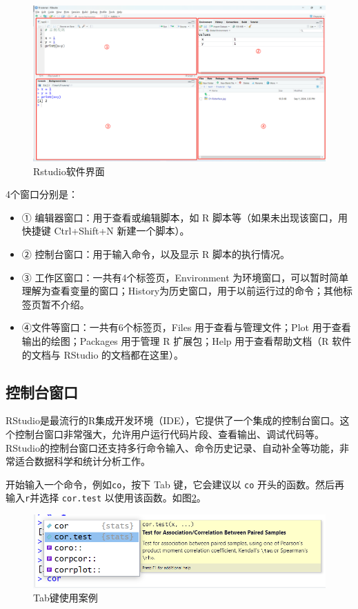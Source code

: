 \documentclass[
]{book}
\providecommand{\tightlist}{%
  \setlength{\itemsep}{0pt}\setlength{\parskip}{0pt}}
\begin{document}
\begin{figure}

{\centering \includegraphics[width=0.8\linewidth]{figs/02-Rstudio} 

}

\caption{Rstudio软件界面}\label{fig:Rstudio}
\end{figure}

4个窗口分别是：

\begin{itemize}
\tightlist
\item
  ① 编辑器窗口：用于查看或编辑脚本，如 R 脚本等（如果未出现该窗口，用快捷键 Ctrl+Shift+N 新建一个脚本）。
\item
  ② 控制台窗口：用于输入命令，以及显示 R 脚本的执行情况。
\item
  ③ 工作区窗口：一共有4个标签页，Environment 为环境窗口，可以暂时简单理解为查看变量的窗口；History为历史窗口，用于以前运行过的命令；其他标签页暂不介绍。
\item
  ④文件等窗口：一共有6个标签页，Files 用于查看与管理文件；Plot 用于查看输出的绘图；Packages 用于管理 R 扩展包；Help 用于查看帮助文档（R 软件的文档与 RStudio 的文档都在这里）。
\end{itemize}

\subsection{控制台窗口}\label{ux63a7ux5236ux53f0ux7a97ux53e3}

RStudio是最流行的R集成开发环境（IDE），它提供了一个集成的控制台窗口。这个控制台窗口非常强大，允许用户运行代码片段、查看输出、调试代码等。RStudio的控制台窗口还支持多行命令输入、命令历史记录、自动补全等功能，非常适合数据科学和统计分析工作。

开始输入一个命令，例如\texttt{co}，按下 Tab 键，它会建议以 \texttt{co} 开头的函数。然后再输入\texttt{r}并选择 \texttt{cor.test} 以使用该函数。如图\ref{fig:cortest}。

\begin{figure}

{\centering \includegraphics[width=0.8\linewidth]{figs/03-Cor.test} 

}

\caption{Tab键使用案例}\label{fig:cortest}
\end{figure}
\end{document}
